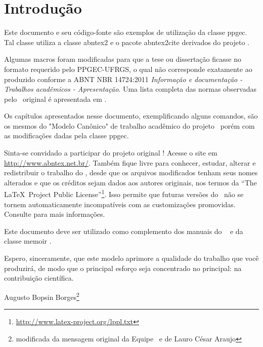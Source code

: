 %
%
%
%
\chapter{Introdução}\label{introducao}

Este documento e seu código-fonte são exemplos de utilização da classe \textsf{ppgec}. Tal classe utiliza a classe \textsf{abntex2} e o pacote \textsf{abntex2cite} derivados do projeto \abnTeX. 

Algumas macros foram modificadas para que a tese ou dissertação ficasse no formato requerido pelo PPGEC-UFRGS, o qual não corresponde exatamente ao produzido conforme a ABNT NBR 14724:2011 \emph{Informação e documentação - Trabalhos acadêmicos - Apresentação}. Uma lista completa das normas observadas pelo \abnTeX\ original é apresentada em .

Os capítulos apresentados nesse documento, exemplificando alguns comandos, são os mesmos do "Modelo Canônico" de trabalho acadêmico do projeto \abnTeX\ porém com as modificações dadas pela classe \textsf{ppgec}.

Sinta-se convidado a participar do projeto original \abnTeX! Acesse o site em
\url{http://www.abntex.net.br/}. Também fique livre para conhecer,
estudar, alterar e redistribuir o trabalho do \abnTeX, desde que os arquivos
modificados tenham seus nomes alterados e que os créditos sejam dados aos
autores originais, nos termos da ``The \LaTeX\ Project Public
License''\footnote{\url{http://www.latex-project.org/lppl.txt}}. Isso permite que futuras versões do \abnTeX~não se tornem automaticamente
incompatíveis com as customizações promovidas. Consulte
 para mais informações.

Este documento deve ser utilizado como complemento dos manuais do \abnTeX\ 
\cite{abntex2classe,abntex2cite,abntex2cite-alf} e da classe \textsf{memoir}
\cite{memoir}. 

Espero, sinceramente, que este modelo aprimore a qualidade do trabalho que
você produzirá, de modo que o principal esforço seja concentrado no principal:
na contribuição científica.


Augusto Bopsin Borges\footnote{modificada da mensagem original da Equipe \abnTeX~e de Lauro César Araujo}
  

